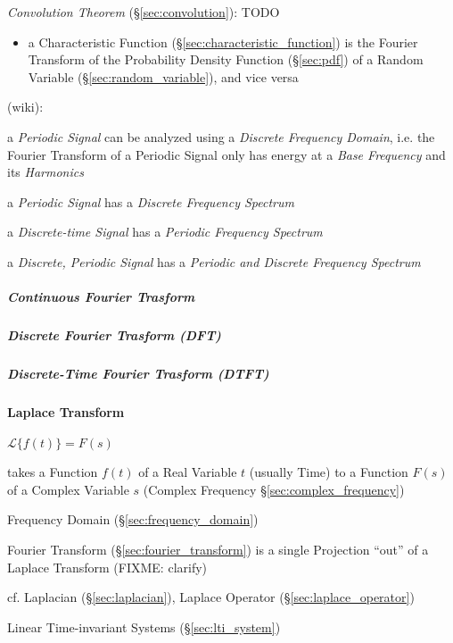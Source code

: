 \emph{Convolution Theorem} (\S\ref{sec:convolution}): TODO

\begin{itemize}
  \item a Characteristic Function (\S\ref{sec:characteristic_function}) is the
    Fourier Transform of the Probability Density Function (\S\ref{sec:pdf}) of a
    Random Variable (\S\ref{sec:random_variable}), and vice versa
\end{itemize}


(wiki):

a \emph{Periodic Signal} can be analyzed using a \emph{Discrete Frequency
  Domain}, i.e. the Fourier Transform of a Periodic Signal only has energy at a
\emph{Base Frequency} and its \emph{Harmonics}

a \emph{Periodic Signal} has a \emph{Discrete Frequency Spectrum}

a \emph{Discrete-time Signal} has a \emph{Periodic Frequency Spectrum}

a \emph{Discrete, Periodic Signal} has a \emph{Periodic and Discrete Frequency
  Spectrum}



\subparagraph{Continuous Fourier Trasform}
\label{sec:continuous_fourier_transform}\hfill

\subparagraph{Discrete Fourier Trasform (DFT)}\label{sec:dft}\hfill

\subparagraph{Discrete-Time Fourier Trasform (DTFT)}\label{sec:dtft}\hfill



\paragraph{Laplace Transform}\label{sec:laplace_transform}\hfill

$\mathcal{L}\{f(t)\} = F(s)$

takes a Function $f(t)$ of a Real Variable $t$ (usually Time) to a Function
$F(s)$ of a Complex Variable $s$ (Complex Frequency
\S\ref{sec:complex_frequency})

\fist Frequency Domain (\S\ref{sec:frequency_domain})

\fist Fourier Transform (\S\ref{sec:fourier_transform}) is a single Projection
``out'' of a Laplace Transform (FIXME: clarify)

\fist cf. Laplacian (\S\ref{sec:laplacian}), Laplace Operator
(\S\ref{sec:laplace_operator}) %

\fist Linear Time-invariant Systems (\S\ref{sec:lti_system})

